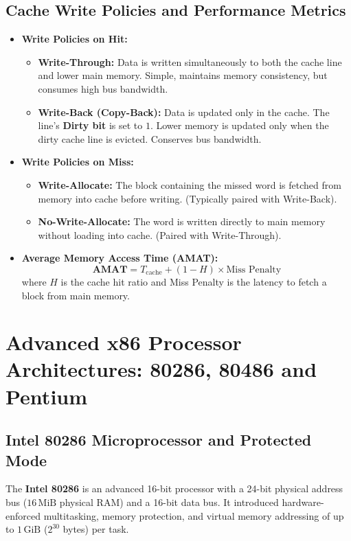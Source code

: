 \documentclass[12pt,a4paper]{article}
\begin{document}
\subsection{Cache Write Policies and Performance Metrics}
\begin{itemize}[leftmargin=*]
  \item \textbf{Write Policies on Hit:}
  \begin{itemize}[leftmargin=*]
    \item \textbf{Write-Through:} Data is written simultaneously to both the cache line and lower main memory. Simple, maintains memory consistency, but consumes high bus bandwidth.
    \item \textbf{Write-Back (Copy-Back):} Data is updated only in the cache. The line's \textbf{Dirty bit} is set to $1$. Lower memory is updated only when the dirty cache line is evicted. Conserves bus bandwidth.
  \end{itemize}
  \item \textbf{Write Policies on Miss:}
  \begin{itemize}[leftmargin=*]
    \item \textbf{Write-Allocate:} The block containing the missed word is fetched from memory into cache before writing. (Typically paired with Write-Back).
    \item \textbf{No-Write-Allocate:} The word is written directly to main memory without loading into cache. (Paired with Write-Through).
  \end{itemize}
  \item \textbf{Average Memory Access Time (AMAT):}
  \[
  \mathbf{AMAT} = T_{\mathrm{cache}} + (1 - H) \times \text{Miss Penalty}
  \]
  where $H$ is the cache hit ratio and Miss Penalty is the latency to fetch a block from main memory.
\end{itemize}

\section{Advanced x86 Processor Architectures: 80286, 80486 and Pentium}

\subsection{Intel 80286 Microprocessor and Protected Mode}
\begin{tcolorbox}[defbox, title={Intel 80286 Architectural Highlights}]
The \textbf{Intel 80286} is an advanced 16-bit processor with a 24-bit physical address bus ($16\,\mathrm{MiB}$ physical RAM) and a 16-bit data bus. It introduced hardware-enforced multitasking, memory protection, and virtual memory addressing of up to $1\,\mathrm{GiB}$ ($2^{30}$ bytes) per task.
\end{tcolorbox}
\end{document}
